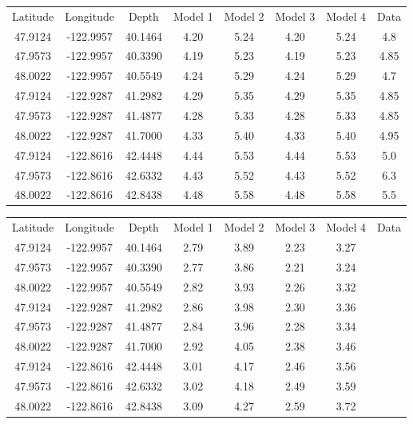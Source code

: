 \documentclass[main.tex]{subfiles}
\begin{document}
\begin{center}
\begin{tabular}{| c | c | c | c | c | c | c | c |}
  \hline
  Latitude & Longitude & Depth & Model 1 & Model 2 & Model 3 & Model 4 & Data \\
  47.9124 & -122.9957 & 40.1464 & 4.20 & 5.24 & 4.20 & 5.24 & 4.8 \\
  47.9573 & -122.9957 & 40.3390 & 4.19 & 5.23 & 4.19 & 5.23 & 4.85 \\
  48.0022 & -122.9957 & 40.5549 & 4.24 & 5.29 & 4.24 & 5.29 & 4.7 \\
  47.9124 & -122.9287 & 41.2982 & 4.29 & 5.35 & 4.29 & 5.35 & 4.85 \\
  47.9573 & -122.9287 & 41.4877 & 4.28 & 5.33 & 4.28 & 5.33 & 4.85 \\
  48.0022 & -122.9287 & 41.7000 & 4.33 & 5.40 & 4.33 & 5.40 & 4.95 \\
  47.9124 & -122.8616 & 42.4448 & 4.44 & 5.53 & 4.44 & 5.53 & 5.0 \\
  47.9573 & -122.8616 & 42.6332 & 4.43 & 5.52 & 4.43 & 5.52 & 6.3 \\
  48.0022 & -122.8616 & 42.8438 & 4.48 & 5.58 & 4.48 & 5.58 & 5.5 \\
  \hline
\end{tabular}
\captionsetup{type=table}
\end{center}

\begin{center}
\begin{tabular}{| c | c | c | c | c | c | c | c |}
  \hline
  Latitude & Longitude & Depth & Model 1 & Model 2 & Model 3 & Model 4 & Data \\
  47.9124 & -122.9957 & 40.1464 & 2.79 & 3.89 & 2.23 & 3.27 & \\
  47.9573 & -122.9957 & 40.3390 & 2.77 & 3.86 & 2.21 & 3.24 & \\
  48.0022 & -122.9957 & 40.5549 & 2.82 & 3.93 & 2.26 & 3.32 & \\
  47.9124 & -122.9287 & 41.2982 & 2.86 & 3.98 & 2.30 & 3.36 & \\
  47.9573 & -122.9287 & 41.4877 & 2.84 & 3.96 & 2.28 & 3.34 & \\
  48.0022 & -122.9287 & 41.7000 & 2.92 & 4.05 & 2.38 & 3.46 & \\
  47.9124 & -122.8616 & 42.4448 & 3.01 & 4.17 & 2.46 & 3.56 & \\
  47.9573 & -122.8616 & 42.6332 & 3.02 & 4.18 & 2.49 & 3.59 & \\
  48.0022 & -122.8616 & 42.8438 & 3.09 & 4.27 & 2.59 & 3.72 & \\
  \hline
\end{tabular}
\captionsetup{type=table}
\end{center}
\end{document}
